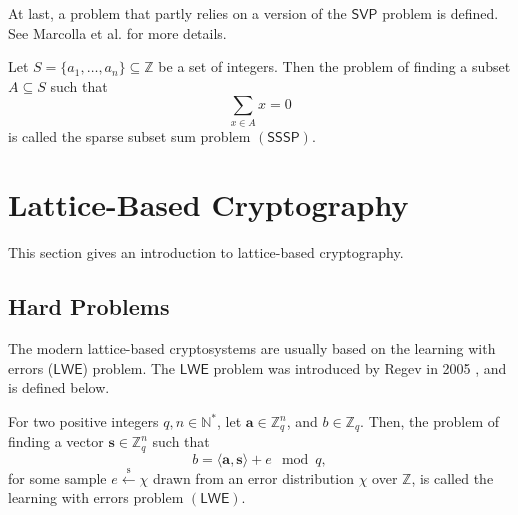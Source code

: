 

At last, a problem that partly relies on a version of the $\mathsf{SVP}$ problem is defined. See Marcolla et al. \cite{cite:QianFHE} for more details.
\begin{definition}\label{def:sssp}
Let $S = \{a_1, \dots, a_n\} \subseteq \mathbb{Z}$ be a set of integers. Then the problem of finding a subset $A \subseteq S$ such that
$$\sum_{x \in A} x = 0$$
is called the sparse subset sum problem $(\mathsf{SSSP})$.
\end{definition}



\section{Lattice-Based Cryptography} %

This section gives an introduction to lattice-based cryptography.

\subsection{Hard Problems}

The modern lattice-based cryptosystems are usually based on the learning with errors ($\mathsf{LWE}$) problem. The $\mathsf{LWE}$ problem was introduced by Regev in 2005 \cite{cite:lwe_first}, and is defined below.

\begin{definition}\label{def:lwe_prob}
For two positive integers \linebreak $q,n \in \mathbb{N}^*$, let $\mathbf{a} \in \mathbb{Z}_q^n$, and $b \in \mathbb{Z}_q$. Then, the problem of finding a vector $\mathbf{s} \in  \mathbb{Z}_q^n$ such that
$$ b = \langle \mathbf{a}, \mathbf{s} \rangle + e \mod q,$$
for some sample $e \xleftarrow{\text{s}} \chi$ drawn from an error distribution $\chi$ over $\mathbb{Z}$, is called the learning with errors problem $(\mathsf{LWE})$.
\end{definition}

